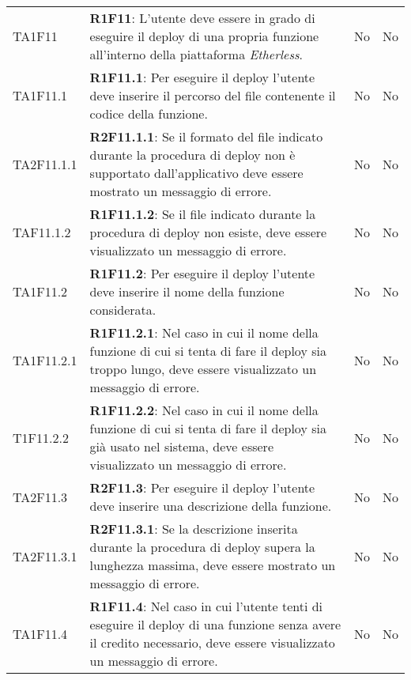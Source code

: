 \begin{longtable}{
		>{\centering}p{} 
		>{}p{}
		>{\centering}p{}
		>{\centering}p{} }
	TA1F11 		& \textbf{R1F11}: L'utente deve essere in grado di eseguire il deploy\ped{\textit{G}} di una propria funzione all'interno della piattaforma \textit{Etherless}. 							& No & No \tabularnewline
	TA1F11.1 	& \textbf{R1F11.1}: Per eseguire il deploy\ped{\textit{G}} l'utente deve inserire il percorso del file contenente il codice della funzione. 												& No & No \tabularnewline
	TA2F11.1.1 	& \textbf{R2F11.1.1}: Se il formato del file indicato durante la procedura di deploy\ped{\textit{G}} non è supportato dall'applicativo deve essere mostrato un messaggio di errore.			& No & No \tabularnewline
	TAF11.1.2 	& \textbf{R1F11.1.2}: Se il file indicato durante la procedura di deploy\ped{\textit{G}} non esiste, deve essere visualizzato un messaggio di errore.										& No & No \tabularnewline
	TA1F11.2 	& \textbf{R1F11.2}: Per eseguire il deploy\ped{\textit{G}} l'utente deve inserire il nome della funzione considerata. 																		& No & No \tabularnewline
	TA1F11.2.1 	& \textbf{R1F11.2.1}: Nel caso in cui il nome della funzione di cui si tenta di fare il deploy\ped{\textit{G}} sia troppo lungo, deve essere visualizzato un messaggio di errore. 			& No & No \tabularnewline
	T1F11.2.2 	& \textbf{R1F11.2.2}: Nel caso in cui il nome della funzione di cui si tenta di fare il deploy\ped{\textit{G}} sia già usato nel sistema, deve essere visualizzato un messaggio di errore.	& No & No \tabularnewline
	TA2F11.3 	& \textbf{R2F11.3}: Per eseguire il deploy\ped{\textit{G}} l'utente deve inserire una descrizione della funzione. 																			& No & No \tabularnewline
	TA2F11.3.1 	& \textbf{R2F11.3.1}: Se la descrizione inserita durante la procedura di deploy\ped{\textit{G}} supera la lunghezza massima, deve essere mostrato un messaggio di errore. 					& No & No \tabularnewline
	TA1F11.4 	& \textbf{R1F11.4}: Nel caso in cui l'utente tenti di eseguire il deploy\ped{\textit{G}} di una funzione senza avere il credito necessario, deve essere visualizzato un messaggio di errore. & No & No \tabularnewline


\end{longtable}
